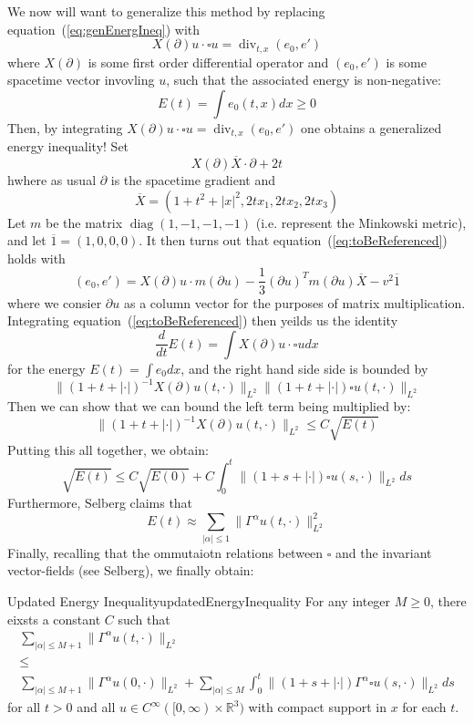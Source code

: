 \documentclass{book}
\newcommand{\R}{{\mathbb{R}}}
\newcommand{\oln}[1]{{\overline{#1}}}
\begin{document}
We now will want to generalize this method by replacing equation~(\ref{eq:genEnergIneq}) with
\[
	X(  \partial ) u\cdot \square u = \operatorname{div}_{t, x}(e_0, e')
\]
where $X(  \partial )$ is some first order differential operator and $(e_0, e')$ is some spacetime vector invovling $u$,
such that the associated energy is non-negative:
\[
 E(t) = \int e_0(t,x)dx \ge 0
\]
Then, by integrating $X(  \partial ) u\cdot \square u = \operatorname{div}_{t, x}(e_0, e')$ one obtains
a generalized energy inequality! Set
\begin{equation}\label{eq:toBeReferenced}
  X(  \partial ) \oln{X} \cdot  \partial + 2t
\end{equation}
hwhere as usual $ \partial$ is the spacetime gradient and
\[
	\oln{X} = (1 + t^2 + |x|^2, 2tx_1, 2tx_2, 2tx_3)
\]
Let $m$ be the matrix $\operatorname{diag}(1, -1, -1, -1)$ (i.e. represent the Minkowski metric), and let $\oln{1}
= (1,0,0,0)$. It then turns out that equation~(\ref{eq:toBeReferenced}) holds with
\[
	(e_0, e') = X(  \partial )u\cdot m(  \partial u ) - \frac{1}{3} (  \partial u )^T m(  \partial
	u ) \oln{X} - v^2\oln{1}
\]
where we consier $ \partial u$ as a column vector for the purposes of matrix multiplication. Integrating
equation~(\ref{eq:toBeReferenced}) then yeilds us the identity
\[
	\frac{d}{dt} E(t) = \int X(  \partial) u \cdot \square u dx
\]
for the energy $E(t) = \int e_0 dx$, and the right hand side side is bounded by
\[
	\|(1 + t + |\cdot|)^{-1}X( \partial)u(t, \cdot)\|_{L^2}\|(1 + t + |\cdot|)\square u(t,
	\cdot)\|_{L^2}
\]
Then we can show that we can bound the left term being multiplied by:
\[
	\|(1 + t + |\cdot|)^{-1}X( \partial)u(t, \cdot)\|_{L^2} \le C\sqrt{E(t)}
\]
Putting this all together, we obtain:
\[
	\sqrt{E(t)} \le C\sqrt{E(0)} + C\int_0^t \|(1 + s  +|\cdot|)\square u(s, \cdot)\|_{L^2}ds
\]
Furthermore, Selberg claims that
\[
	E(t) \approx \sum_{|\alpha| \le 1} \|\Gamma^\alpha u(t, \cdot)\|_{L^2}^2
\]
Finally, recalling that the ommutaiotn relations between $\square$ and the invariant vector-fields (see
Selberg), we finally obtain:
\begin{prop}{Updated Energy Inequality}{updatedEnergyInequality}
	For any integer $M \ge 0$, there eixsts a constant $C$ such that
	\begin{gather*}
		\sum_{|\alpha| \le M+1} \|\Gamma^\alpha u(t, \cdot)\|_{L^2}\\
		\le\\
		\sum_{|\alpha| \le M+1} \| \Gamma^{\alpha}u(0, \cdot)\|_{L^2} + \sum_{|\alpha| \le M}
		\int_{0}^t \|(1 + s + |\cdot|)\Gamma^{\alpha}\square u(s, \cdot)\|_{L^2}ds
	\end{gather*}
	for all $t > 0$ and all $u \in C^\infty([0, \infty)\times \R^3)$ with compact support in $x$ for each
	$t$.
\end{prop}
\end{document}
